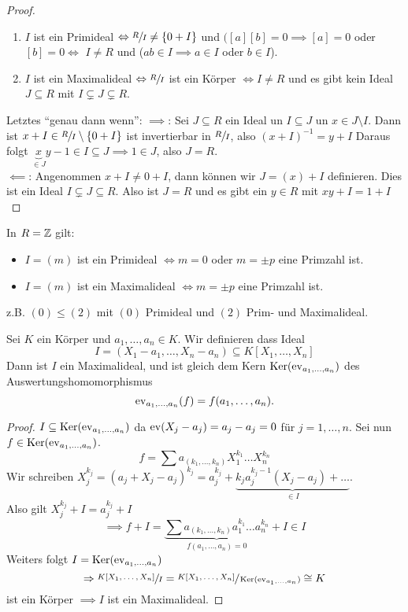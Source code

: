 \begin{proof}
	\begin{enumerate}[1)]
		\item $I$ ist ein Primideal $\Leftrightarrow \sfrac{R}{I} \neq \{0+I\} $ und $([ a ] [ b ] = 0 \implies [ a ] = 0$ oder $[ b ] = 0 \Leftrightarrow$
			$I \neq R$ und ($ab \in I \implies a \in I$ oder $b \in I$).
		\item $I$ ist ein Maximalideal $\Leftrightarrow \sfrac{R}{I}$ ist ein Körper $\Leftrightarrow I \neq R$ und es gibt kein Ideal $J \subseteq R$ mit 
			$I \subsetneq J \subsetneq R$.
	\end{enumerate}
	Letztes \enquote{genau dann wenn}: $\implies$: Sei  $J \subseteq R$ ein Ideal un $I \subseteq J$ un $x \in J \setminus I$. 
	Dann ist $x+I \in \sfrac{R}{I} \setminus \{0+I\} $ ist invertierbar
	in $\sfrac{R}{I}$, also $(x+I)^{-1} = y+I$ Daraus folgt $\underbrace{x}_{\in J}y -1 \in I \subseteq J \implies 1 \in J$, also $J = R$.\\
	$\impliedby$: Angenommen $x+I \neq  0+I$, dann können wir $J = (x)+I$ definieren.
	Dies ist ein Ideal $ I \subsetneq J \subseteq R$. Also ist $J = R$ und es gibt ein $y \in R$ mit $xy + I = 1 + I$
\end{proof}

\begin{eg}
	In $R = \mathbb{Z}$ gilt:
	\begin{itemize}
		\item $I =(m)$ ist ein Primideal $\Leftrightarrow m=0$ oder $m=\pm p$ eine Primzahl ist.
		\item $I=(m)$ ist ein Maximalideal $\Leftrightarrow m= \pm p$ eine Primzahl ist.
	\end{itemize}
	z.B. $(0) \leq (2) $ mit $(0)$ Primideal und $(2)$ Prim- und Maximalideal.
\end{eg}

\begin{eg}
	Sei $K$ ein Körper und $a_1,\ldots,a_{n} \in K$. Wir definieren dass Ideal 
	\[
		I = (X_1 - a_1,\ldots,X_{n} - a_{n}) \subseteq K[X_1,\ldots,X_{n}]
	\] 
	Dann ist $I$ ein Maximalideal, und ist gleich dem Kern $\operatorname{Ker}(\operatorname{ev}_{a_1,\ldots,a_{n}})$ des Auswertungshomomorphismus
	\[
		\operatorname{ev}_{a_1,\ldots,a_{n}}(f) = f(a_1,\ldots,a_{n})
	.\] 
	\begin{proof}
	$I \subseteq \operatorname{Ker}(\operatorname{ev}_{a_1,\ldots,a_{n}})$ da $\operatorname{ev}(X_{j} - a_{j}) = a_{j} - a_{j} = 0$ für $j = 1,\ldots,n$.
	Sei nun $f \in \operatorname{Ker}(\operatorname{ev}_{a_1,\ldots,a_{n}})$. 
	\[
		f = \sum a_{(k_1,\ldots,k_{n})} X_1^{k_1} \ldots X_{n}^{k_{n}}
	\]
	Wir schreiben $X_{j}^{k_{j}} = (a_{j} + X_{j} - a_{j})^{k_{j}} = a_{j}^{k_{j}} + \underbrace{k_{j} a_{j}^{k_{j}-1} (X_{j} - a_{j}) + \ldots}_{\in I}$.\\
	Also gilt $X_{j}^{k_{j}} + I = a_{j}^{k_{j}} + I$ 
	\[
		\implies f + I = \underbrace{\sum a_{(k_1,\ldots,k_{n})} a_1^{k_1}\ldots a_{n}^{k_{n}}}_{f(a_1,\ldots,a_{n}) = 0} + I \in I
	\]
	Weiters folgt $I = \operatorname{Ker}(\operatorname{ev}_{a_1,\ldots,a_{n}})$
	\[
		\Rightarrow \sfrac{K[X_1,\ldots,X_{n}]}{I} = \sfrac{K[X_1,\ldots,X_{n}]}{\operatorname{Ker}(\operatorname{ev}_{a_1,\ldots,a_{n}})} \cong K
	\]
	ist ein Körper $\implies I$ ist ein Maximalideal.
	\end{proof}
\end{eg}

